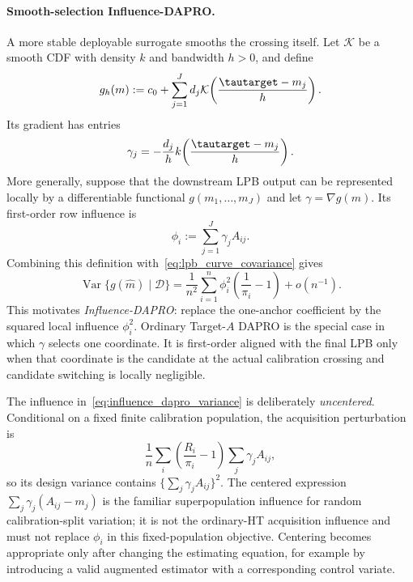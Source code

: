 \paragraph{Smooth-selection Influence-DAPRO.}
A more stable deployable surrogate smooths the crossing itself.  Let
$\mathcal K$ be a smooth CDF with density $k$ and bandwidth $h>0$, and define
\begin{equation}
    g_h(m):=c_0+\sum_{j=1}^Jd_j
      \mathcal K\!\left(
        \frac{\tautarget-m_j}{h}
      \right).
    \label{eq:smooth_lpb_selector}
\end{equation}
Its gradient has entries
\begin{equation}
    \gamma_j
    =-\frac{d_j}{h}
      k\!\left(\frac{\tautarget-m_j}{h}\right).
\end{equation}
More generally, suppose that the downstream LPB output can be represented
locally by a differentiable functional $g(m_1,\ldots,m_J)$ and let
$\gamma=\nabla g(m)$.  Its first-order row influence is
\begin{equation}
    \phi_i:=\sum_{j=1}^J\gamma_jA_{ij}.
\end{equation}
Combining this definition with~\eqref{eq:lpb_curve_covariance} gives
\begin{equation}
    \operatorname{Var}\{g(\widehat m)\mid\mathcal D\}
    =\frac{1}{n^2}\sum_{i=1}^n
      \phi_i^2\left(\frac{1}{\pi_i}-1\right)
      +o(n^{-1}).
    \label{eq:influence_dapro_variance}
\end{equation}
This motivates \emph{Influence-DAPRO}: replace the one-anchor coefficient by
the squared local influence $\phi_i^2$.  Ordinary Target-$A$ DAPRO is the
special case in which $\gamma$ selects one coordinate.  It is first-order
aligned with the final LPB only when that coordinate is the candidate at the
actual calibration crossing and candidate switching is locally negligible.

The influence in~\eqref{eq:influence_dapro_variance} is deliberately
\emph{uncentered}.  Conditional on a fixed finite calibration population, the
acquisition perturbation is
\begin{equation}
    \frac{1}{n}\sum_i
      \left(\frac{R_i}{\pi_i}-1\right)
      \sum_j\gamma_jA_{ij},
\end{equation}
so its design variance contains
$\{\sum_j\gamma_jA_{ij}\}^2$.  The centered expression
$\sum_j\gamma_j(A_{ij}-m_j)$ is the familiar superpopulation influence for
random calibration-split variation; it is not the ordinary-HT acquisition
influence and must not replace $\phi_i$ in this fixed-population objective.
Centering becomes appropriate only after changing the estimating equation,
for example by introducing a valid augmented estimator with a corresponding
control variate.

